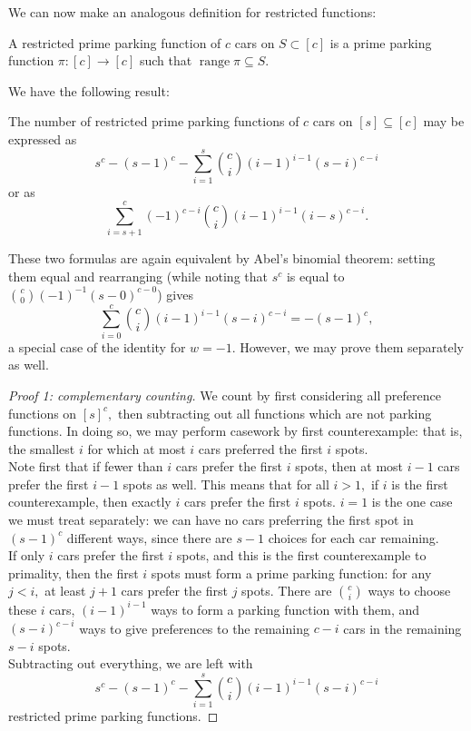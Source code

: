 We can now make an analogous definition for restricted functions:

\begin{definition}
    A restricted prime parking function of $c$ cars on $S\subset [c]$ is a prime parking function $\pi : [c] \to [c]$ such that $\operatorname{range} \pi \subseteq S.$
\end{definition}

We have the following result:

\begin{theorem}
    The number of restricted prime parking functions of $c$ cars on $[s]\subseteq [c]$ may be expressed as
    \[s^c-(s-1)^c-\sum_{i=1}^s \binom{c}{i}(i-1)^{i-1}(s-i)^{c-i}\]
    or as
    \[\sum_{i=s+1}^{c} (-1)^{c - i} \binom{c}{i}(i-1)^{i-1}(i-s)^{c-i}.\]
\end{theorem}

These two formulas are again equivalent by Abel's binomial theorem: setting them equal and rearranging (while noting that $s^c$ is equal to $\binom{c}{0}(-1)^{-1}(s-0)^{c-0}$) gives
\[\sum_{i=0}^c \binom{c}{i}(i-1)^{i-1}(s-i)^{c-i}=-(s-1)^c,\] a special case of the identity for $w=-1.$ However, we may prove them separately as well.

\begin{proof}[Proof 1: complementary counting]
    We count by first considering all preference functions on $[s]^c,$ then subtracting out all functions which are not parking functions. In doing so, we may perform casework by first counterexample: that is, the smallest $i$ for which at most $i$ cars preferred the first $i$ spots.\\

    Note first that if fewer than $i$ cars prefer the first $i$ spots, then at most $i-1$ cars prefer the first $i-1$ spots as well. This means that for all $i>1,$ if $i$ is the first counterexample, then exactly $i$ cars prefer the first $i$ spots. $i=1$ is the one case we must treat separately: we can have no cars preferring the first spot in $(s-1)^c$ different ways, since there are $s-1$ choices for each car remaining.\\

    If only $i$ cars prefer the first $i$ spots, and this is the first counterexample to primality, then the first $i$ spots must form a prime parking function: for any $j<i,$ at least $j+1$ cars prefer the first $j$ spots. There are $\binom{c}{i}$ ways to choose these $i$ cars, $(i-1)^{i-1}$ ways to form a parking function with them, and $(s-i)^{c-i}$ ways to give preferences to the remaining $c-i$ cars in the remaining $s-i$ spots.\\

    Subtracting out everything, we are left with \[s^c-(s-1)^c-\sum_{i=1}^s \binom{c}{i}(i-1)^{i-1}(s-i)^{c-i}\] restricted prime parking functions.
\end{proof}

